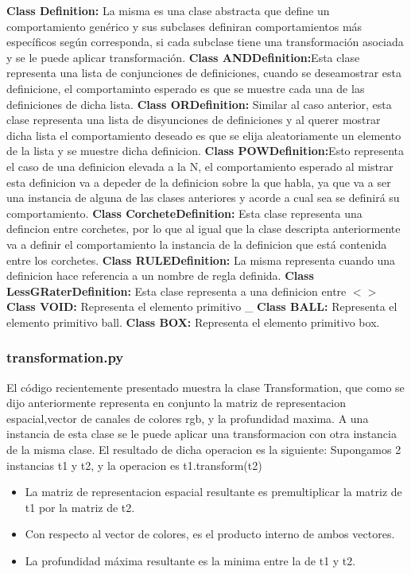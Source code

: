 \textbf{Class Definition:} La misma es una clase abstracta que define un comportamiento gen\'erico y sus subclases 
definiran comportamientos m\'as espec\'ificos seg\'un corresponda, si cada subclase tiene una transformaci\'on asociada y se le puede aplicar transformaci\'on.
\textbf{Class ANDDefinition:}Esta clase representa una lista de conjunciones de definiciones, cuando se deseamostrar esta definicione, el comportaminto esperado es que se muestre cada una de las definiciones de dicha lista.
\textbf{Class ORDefinition:} Similar al caso anterior, esta clase representa una lista de disyunciones de definiciones y al querer mostrar dicha lista el comportamiento deseado es que se elija aleatoriamente un elemento de la lista y se muestre dicha definicion.
\textbf{Class POWDefinition:}Esto representa el caso de una definicion elevada a la N, el comportamiento esperado al mistrar esta definicion va a depeder de la definicion sobre la que habla, ya que va a ser una instancia de alguna de las clases anteriores y acorde a cual sea se definir\'a su comportamiento.
\textbf{Class CorcheteDefinition:} Esta clase representa una defincion entre corchetes, por lo que al igual que la clase descripta anteriormente va a definir el comportamiento la instancia de la definicion que est\'a contenida entre los corchetes.
\textbf{Class RULEDefinition:} La misma representa cuando una definicion hace referencia a un nombre de regla definida. 
\textbf{Class LessGRaterDefinition:} Esta clase representa a una definicion entre $<>$
\textbf{Class VOID:} Representa el elemento primitivo \_
\textbf{Class BALL:} Representa el elemento primitivo ball.
\textbf{Class BOX:}  Representa el elemento primitivo box.
\newpage
\subsubsection{transformation.py}



El c\'odigo recientemente presentado muestra la clase Transformation, que como se dijo anteriormente representa en conjunto la matriz de representacion espacial,vector de canales de colores rgb, y la profundidad maxima.
A una instancia de esta clase se le puede aplicar una transformacion con otra instancia de la misma clase. El resultado de dicha operacion es la siguiente:
Supongamos 2 instancias t1 y t2, y la operacion es t1.transform(t2)
\begin{itemize}
\item [] La matriz de representacion espacial resultante es premultiplicar la matriz de t1 por la matriz de t2. 
\item [] Con respecto al vector de colores, es el producto interno de ambos vectores.
\item [] La profundidad m\'axima resultante es la minima entre la de t1 y t2. 
\end{itemize}

